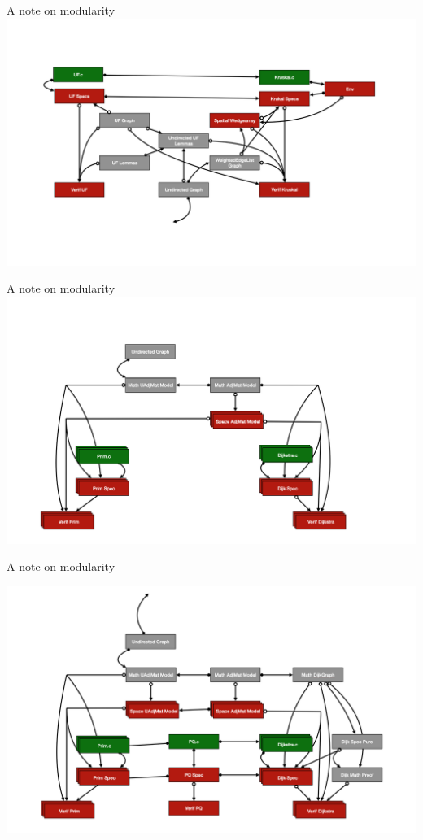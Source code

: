 \documentclass[usenames, xcolor=dvipsnames]{beamer}
\begin{document}
\begin{frame}{A note on modularity}
\centering
  \includegraphics[scale=0.33]{krus}
\end{frame}

\begin{frame}{A note on modularity}
\centering
  \includegraphics[scale=0.33]{simple}
\end{frame}

\begin{frame}{A note on modularity}

{\centering
  \includegraphics[scale=0.33]{dijk_prim}
  
}
\end{frame}
\end{document}
